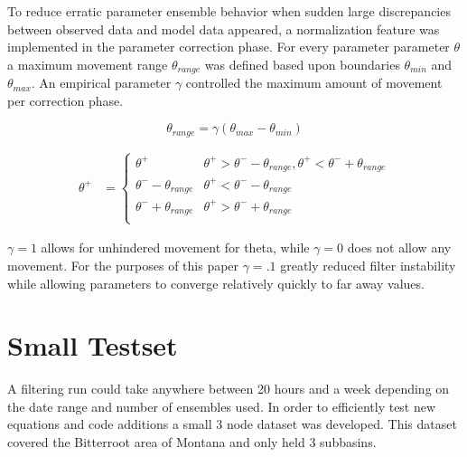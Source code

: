 To reduce erratic parameter ensemble behavior when sudden large discrepancies between observed data and model data appeared, a normalization feature was implemented in the parameter correction phase. For every parameter parameter $\theta$ a maximum movement range $\theta_{range}$ was defined based upon boundaries $\theta_{min}$ and $\theta_{max}$. An empirical parameter $\gamma$ controlled the maximum amount of movement per correction phase. 

\begin{equation}\label{eq:max_movement_thetarange}
\theta_{range} = \gamma(\theta_{max} - \theta_{min})
\end{equation}

\begin{align}\label{eq:max_movement}
\theta^{+} &= \left\{
\begin{array}{ll}
\theta^{+} & \theta^{+} > \theta^{-} - \theta_{range}, \theta^{+} < \theta^{-} + \theta_{range}  \\
\theta^{-} - \theta_{range} & \theta^{+} < \theta^{-} - \theta_{range} \\
\theta^{-} + \theta_{range} & \theta^{+} > \theta^{-} + \theta_{range} \\
\end{array}
\right.
\end{align}


$\gamma = 1$ allows for unhindered movement for theta, while $\gamma = 0$ does not allow any movement. For the purposes of this paper $\gamma = .1$ greatly reduced filter instability while allowing parameters to converge relatively quickly to far away values.

\section{Small Testset}

A filtering run could take anywhere between 20 hours and a week depending on the date range and number of ensembles used. In order to efficiently test new equations and code additions a small 3 node dataset was developed. This dataset covered the Bitterroot area of Montana and only held 3 subbasins.